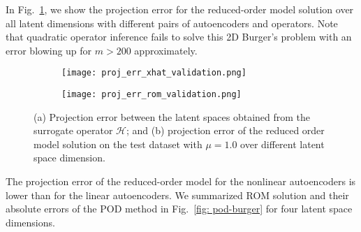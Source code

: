 In Fig.~\ref{fig: proj err rom solution}, we show the projection error for the reduced-order model solution over all latent dimensions with different pairs of autoencoders and operators. Note that quadratic operator inference fails to solve this 2D Burger's problem with an error blowing up for $m > 200$ approximately.
\begin{figure}[!htb]
     \begin{center}
        \begin{subfigure}[b]{0.49\textwidth}
            \begin{center}
            \texttt{[image: proj\_err\_xhat\_validation.png]}
            \end{center}
            \caption{}
        \end{subfigure}
        \begin{subfigure}[b]{0.49\textwidth}
            \begin{center}
           \texttt{[image: proj\_err\_rom\_validation.png]}
            \end{center}
            \caption{}
        \end{subfigure}
     \end{center}
        \caption[Projection errors on the test data.]{(a) Projection error between the latent spaces obtained from the surrogate operator $\mathcal{H}$; and (b) projection error of the reduced order model solution on the test dataset with $\mu = 1.0$ over different latent space dimension.}
        \label{fig: proj err rom solution}
\end{figure}
The projection error of the reduced-order model for the nonlinear autoencoders is lower than for the linear autoencoders. We summarized ROM solution and their absolute errors of the POD method in Fig.~\ref{fig: pod-burger} for four latent space dimensions. 


